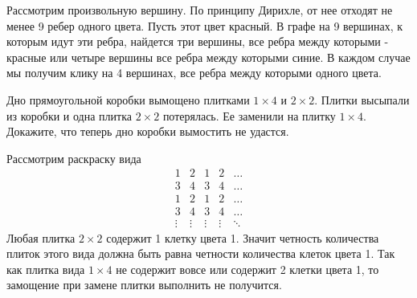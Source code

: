 \documentclass[11pt, a4paper]{common/document_template}
\begin{document}
\begin{Solution}
Рассмотрим произвольную вершину. По принципу Дирихле, от нее отходят не менее 9 ребер одного цвета. Пусть этот цвет красный. В графе на 9 вершинах, к которым идут эти ребра, найдется три вершины, все ребра между которыми - красные или четыре вершины все ребра между которыми синие. В каждом случае мы получим клику на 4 вершинах, все ребра между которыми одного цвета.  
\end{Solution}


\begin{exercise}
Дно прямоугольной коробки вымощено плитками $1 \times 4$ и $2 \times 2$. Плитки высыпали из коробки и одна плитка $2 \times 2$ потерялась. Ее заменили на плитку $1 \times 4$. Докажите, что теперь дно коробки вымостить не удастся.
\end{exercise}

\begin{Solution}
Рассмотрим раскраску вида 
$$
\begin{matrix}
1 & 2 & 1 & 2 & \dots \\
3 & 4 & 3 & 4 & \dots \\
1 & 2 & 1 & 2 & \dots \\
3 & 4 & 3 & 4 & \dots \\
\vdots & \vdots & \vdots & \vdots & \ddots
\end{matrix}
$$
Любая плитка $2 \times 2$ содержит 1 клетку цвета 1. Значит четность количества плиток этого вида должна быть равна четности количества клеток цвета 1. Так как плитка вида $1 \times 4$ не содержит вовсе или содержит 2 клетки цвета 1, то замощение при замене плитки выполнить не получится.
\end{Solution}
\end{document}

